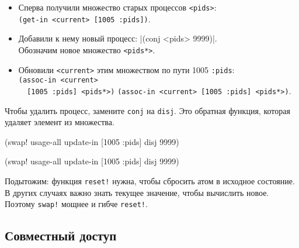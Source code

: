 \begin{itemize}

\item
  Сперва получили множество старых процессов \verb|<pids>|:\\
  \verb|(get-in <current> [1005 :pids])|.

\item
  Добавили к нему новый процесс: \spverb|(conj <pids> 9999)|.\ifnarrow\else\\\fi
  Обозначим новое множество \verb|<pids*>|.

\item
  Обновили \verb|<current>| этим множеством по пути 1005 \arr{} \verb|:pids|:\\
  \ifnarrow
  \verb|(assoc-in <current>| \\
  \verb|  [1005 :pids] <pids*>)|
  \else
  \verb|(assoc-in <current> [1005 :pids] <pids*>)|.
  \fi

\end{itemize}

Чтобы удалить процесс, замените \verb|conj| на \verb|disj|. Это обратная
функция, которая удаляет элемент из множества.


\ifnarrow

\begin{english}
  \begin{clojure}
(swap! usage-all
  update-in [1005 :pids] disj 9999)
  \end{clojure}
\end{english}

\else

\begin{english}
  \begin{clojure}
(swap! usage-all update-in [1005 :pids] disj 9999)
  \end{clojure}
\end{english}

\fi

Подытожим: функция \verb|reset!| нужна, чтобы сбросить атом в исходное
состояние. В других случаях важно знать текущее значение, чтобы вычислить
новое. Поэтому \verb|swap!| мощнее и гибче \verb|reset!|.

\subsection{Совместный доступ}


